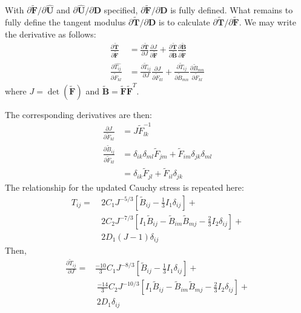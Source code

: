 With $\partial \tilde{\bm F}/\partial \hat{\bm U}$ and $\partial \hat{\bm U}/\partial {\bm D}$ specified, $\partial \tilde{\bm F}/\partial {\bm D}$ is fully defined. What remains to fully define the tangent modulus $\partial \tilde{\bm T}/\partial {\bm D}$ is to calculate $\partial \tilde{\bm T}/\partial \tilde {\bm F}$. We may write the derivative as follows:
\begin{align}
\frac{\partial \tilde{\bm T}}{\partial \tilde{\bm F}} &= \frac{\partial \tilde{\bm T}}{\partial J}\frac{\partial J}{\partial \tilde {\bm F}} + \frac{\partial \tilde{\bm T}}{\partial {\tilde{\bm {B}}}}\frac{\partial {\tilde{\bm {B}}}}{\partial \tilde {\bm F}} \\
\frac{\partial \hat{T_{ij}}}{\partial \tilde{F}_{kl}} &= \frac{\partial \tilde{T}_{ij}}{\partial J}\frac{\partial J}{\partial \tilde{F}_{kl}} + \frac{\partial \tilde{T}_{ij}}{\partial \tilde{B}_{mn}}\frac{\partial \tilde{B}_{mn}}{\partial \tilde{F}_{kl}}
\end{align}
where $J = \det(\tilde{\bm{F}})$ and $\tilde{\bm{B}} = \tilde{\bm{F}}\tilde{\bm{F}}^T$.

The corresponding derivatives are then:
\begin{align}
\frac{\partial J}{\partial {\tilde{F}}_{kl}} &= {J}{\tilde{F}}^{-1}_{lk} \\
\frac{\partial \tilde{B}_{ij}}{\partial {\tilde{F}}_{kl}} &= \delta_{ik}\delta_{ml}{\tilde{F}}_{jm} + {\tilde{F}}_{im}\delta_{jk}\delta_{ml} \\
 &=  \delta_{ik}{\tilde{F}}_{jl} + {\tilde{F}}_{il}\delta_{jk}
\end{align}
The relationship for the updated Cauchy stress is repeated here:
\begin{equation}
\begin{aligned}
T_{ij} = &\ 2C_1J^{-5/3}\left[\tilde{B}_{ij} - \frac{1}{3}I_1\delta_{ij}\right] + \\ 
&\ 2C_2J^{-7/3}\left[I_1\tilde{B}_{ij} - \tilde{B}_{im}\tilde{B}_{mj} - \frac{2}{3}I_2\delta_{ij}\right] + \\
&\ 2D_1(J-1)\delta_{ij}
\end{aligned}
\end{equation}
Then,
\begin{equation}
\begin{aligned}
\frac{\partial \tilde{T}_{ij}}{\partial J} = &\frac{-10}{3}C_1J^{-8/3}\left[\tilde{B}_{ij} - \frac{1}{3}I_1\delta_{ij}\right] + \\
&\ \frac{-14}{3}C_2J^{-10/3}\left[I_1\tilde{B}_{ij} - \tilde{B}_{im}\tilde{B}_{mj} - \frac{2}{3}I_2\delta_{ij}\right] + \\ &\ 2D_1\delta_{ij}
\end{aligned}
\end{equation}

